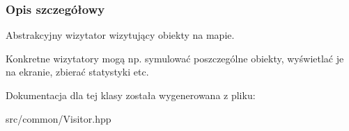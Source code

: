 \subsubsection{Opis szczegółowy}
Abstrakcyjny wizytator wizytujący obiekty na mapie. 

Konkretne wizytatory mogą np. symulować poszczególne obiekty, wyświetlać je na ekranie, zbierać statystyki etc. 

Dokumentacja dla tej klasy została wygenerowana z pliku\-:\begin{DoxyCompactItemize}
\item 
src/common/Visitor.\-hpp\end{DoxyCompactItemize}
